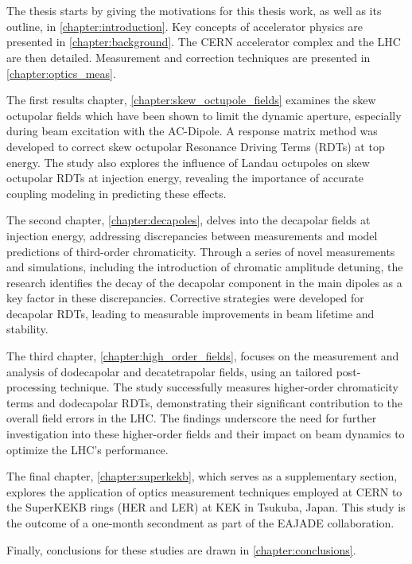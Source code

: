 \section{}

The thesis starts by giving the motivations for this thesis work, as well as its outline, in
\cref{chapter:introduction}. Key concepts of accelerator physics are presented in
\cref{chapter:background}. The CERN accelerator complex and the LHC are then detailed. Measurement
and correction techniques are presented in \cref{chapter:optics_meas}.

The first results chapter, \cref{chapter:skew_octupole_fields} examines the skew octupolar fields
which have been shown to limit the dynamic aperture, especially during beam excitation with the
AC-Dipole. A response matrix method was developed to correct skew octupolar Resonance Driving Terms
(RDTs) at top energy. The study also explores the influence of Landau octupoles on skew octupolar
RDTs at injection energy, revealing the importance of accurate coupling modeling in predicting these
effects.

The second chapter, \cref{chapter:decapoles}, delves into the decapolar fields at injection energy,
addressing discrepancies between measurements and model predictions of third-order chromaticity.
Through a series of novel measurements and simulations, including the introduction of chromatic
amplitude detuning, the research identifies the decay of the decapolar component in the main dipoles
as a key factor in these discrepancies. Corrective strategies were developed for decapolar RDTs,
leading to measurable improvements in beam lifetime and stability.

The third chapter, \cref{chapter:high_order_fields}, focuses on the measurement and analysis of
dodecapolar and decatetrapolar fields, using an tailored post-processing technique. The study
successfully measures higher-order chromaticity terms and dodecapolar RDTs, demonstrating their
significant contribution to the overall field errors in the LHC. The findings underscore the need
for further investigation into these higher-order fields and their impact on beam dynamics to
optimize the LHC's performance.

The final chapter, \cref{chapter:superkekb}, which serves as a supplementary section, explores the
application of optics measurement techniques employed at CERN to the SuperKEKB rings (HER and LER)
at KEK in Tsukuba, Japan. This study is the outcome of a one-month secondment as part of the EAJADE
collaboration.

Finally, conclusions for these studies are drawn in \cref{chapter:conclusions}.